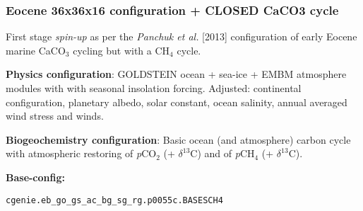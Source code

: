 \documentclass[10pt,twoside]{article}
\begin{document}

\subsubsection{Eocene 36x36x16 configuration + CLOSED CaCO3 cycle}\label{EXAMPLE.p0055c.PO4CH4_S36x36.SPIN1}

First stage \textsl{spin-up} as per the \textit{Panchuk et al.} [2013] configuration of early Eocene marine CaCO$_{3}$ cycling but with a CH$_{4}$ cycle.

\noindent \textbf{Physics configuration}: GOLDSTEIN ocean + sea-ice + EMBM atmosphere modules with with seasonal insolation forcing. Adjusted: continental configuration, planetary albedo, solar constant, ocean salinity, annual averaged wind stress and winds.

\noindent \textbf{Biogeochemistry configuration}: Basic ocean (and atmosphere) carbon cycle with atmospheric restoring of \textit{p}CO$_{2}$ (+ $\delta^{13}$C) and of \textit{p}CH$_{4}$ (+ $\delta^{13}$C).

\noindent \textbf{Base-config:}
\vspace{-10pt}\begin{verbatim}cgenie.eb_go_gs_ac_bg_sg_rg.p0055c.BASESCH4\end{verbatim}\vspace{-10pt}
\end{document}
